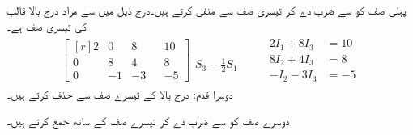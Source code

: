 پہلی صف کو  سے ضرب دے کر تیسری صف سے منفی کرتے ہیں۔درج ذیل میں  سے مراد درج بالا قالب کی تیسری صف
  ہے۔
\begin{gather*}
\begin{bmatrix*}[r]2&0&8&&10\\0&8&4&&8\\
0&-1&-3&&-5  \end{bmatrix*}\begin{matrix} \\ \\ S_3-\frac{1}{2}S_1 \end{matrix} \quad \quad 
\begin{aligned}
2I_1+8I_3&=10\\
8I_2+4I_3&=8\\
-I_2-3I_3&=-5
\end{aligned}
\end{gather*}
دوسرا قدم: درج بالا کے تیسرے صف سے  حذف کرتے ہیں۔

دوسرے صف کو  سے ضرب دے کر تیسرے صف کے ساتھ جمع کرتے ہیں۔ 

